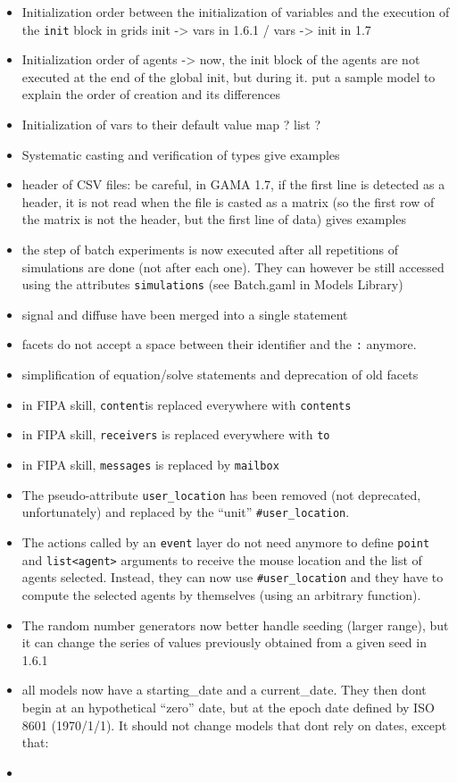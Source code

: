 \documentclass[]{book}
\theoremstyle{definition}
\theoremstyle{definition}
\theoremstyle{definition}
\theoremstyle{remark}
\begin{document}
\begin{itemize}
\item
  Initialization order between the initialization of variables and the
  execution of the \texttt{init} block in grids init -\textgreater{}
  vars in 1.6.1 / vars -\textgreater{} init in 1.7
\item
  Initialization order of agents -\textgreater{} now, the init block of
  the agents are not executed at the end of the global init, but during
  it. put a sample model to explain the order of creation and its
  differences
\item
  Initialization of vars to their default value map ? list ?
\item
  Systematic casting and verification of types give examples
\item
  header of CSV files: be careful, in GAMA 1.7, if the first line is
  detected as a header, it is not read when the file is casted as a
  matrix (so the first row of the matrix is not the header, but the
  first line of data) gives examples
\item
  the step of batch experiments is now executed after all repetitions of
  simulations are done (not after each one). They can however be still
  accessed using the attributes \texttt{simulations} (see Batch.gaml in
  Models Library)
\item
  signal and diffuse have been merged into a single statement
\item
  facets do not accept a space between their identifier and the
  \texttt{:} anymore.
\item
  simplification of equation/solve statements and deprecation of old
  facets
\item
  in FIPA skill, \texttt{content}is replaced everywhere with
  \texttt{contents}
\item
  in FIPA skill, \texttt{receivers} is replaced everywhere with
  \texttt{to}
\item
  in FIPA skill, \texttt{messages} is replaced by \texttt{mailbox}
\item
  The pseudo-attribute \texttt{user\_location} has been removed (not
  deprecated, unfortunately) and replaced by the ``unit''
  \texttt{\#user\_location}.
\item
  The actions called by an \texttt{event} layer do not need anymore to
  define \texttt{point} and \texttt{list\textless{}agent\textgreater{}}
  arguments to receive the mouse location and the list of agents
  selected. Instead, they can now use \texttt{\#user\_location} and they
  have to compute the selected agents by themselves (using an arbitrary
  function).
\item
  The random number generators now better handle seeding (larger range),
  but it can change the series of values previously obtained from a
  given seed in 1.6.1
\item
  all models now have a starting\_date and a current\_date. They then
  dont begin at an hypothetical ``zero'' date, but at the epoch date
  defined by ISO 8601 (1970/1/1). It should not change models that dont
  rely on dates, except that:
\item ~

\end{itemize}
\end{document}
